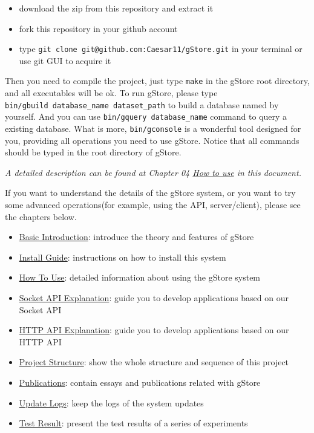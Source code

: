 \documentclass[titlepage, a4paper, 12pt]{article}
\begin{document}
\begin{itemize}
\item
  download the zip from this repository and extract it
\item
  fork this repository in your github account
\item
  type \texttt{git\ clone\ git@github.com:Caesar11/gStore.git} in your
  terminal or use git GUI to acquire it
\end{itemize}

Then you need to compile the project, just type \texttt{make} in the gStore root directory, and all executables will be ok. To run gStore, please type \texttt{bin/gbuild\ database\_name\ dataset\_path} to build a database named by yourself. And you can use \texttt{bin/gquery\ database\_name} command to query a existing database. What is more, \texttt{bin/gconsole} is a wonderful tool designed for you, providing all operations you need to use gStore.
Notice that all commands should be typed in the root directory of gStore.

\emph{A detailed description can be found at Chapter 04
\hyperref[chapter04]{How to use} in this document.}


If you want to understand the details of the gStore system, or you want to try some advanced operations(for example, using the API, server/client), please see the chapters below.

\begin{itemize}
\item
  \hyperref[chapter02]{Basic Introduction}: introduce the theory and features of gStore
\item
  \hyperref[chapter03]{Install Guide}: instructions on how to install this system
\item
  \hyperref[chapter04]{How To Use}: detailed information about using the gStore system
\item
  \hyperref[chapter05]{Socket API Explanation}: guide you to develop applications based on our Socket API
\item  
  \hyperref[chapter06]{HTTP API Explanation}: guide you to develop applications based on our HTTP API
\item
  \hyperref[chapter08]{Project Structure}: show the whole structure and sequence of this project
\item
  \hyperref[chapter09]{Publications}: contain essays and publications
  related with gStore
\item
  \hyperref[chapter10]{Update Logs}: keep the logs of the system updates
\item
  \hyperref[chapter15]{Test Result}: present the test results of a series of experiments
\end{itemize}
\end{document}
